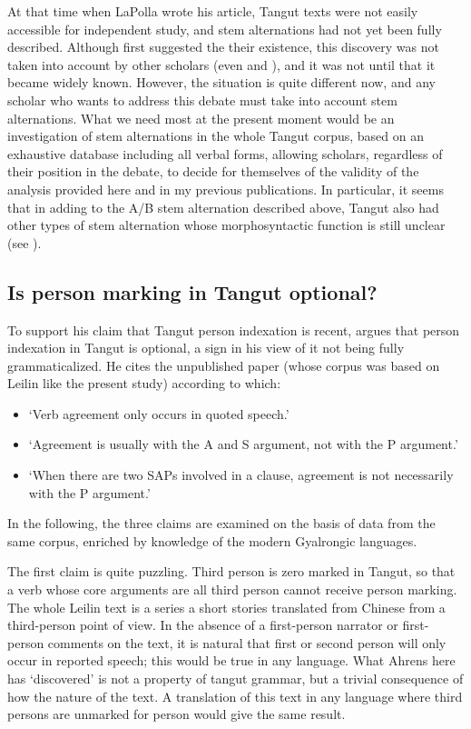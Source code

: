 \documentclass[oldfontcommands,oneside,a4paper,11pt]{article}
\begin{document}
At that time when LaPolla wrote his article, Tangut texts were not easily accessible for independent study, and stem alternations had not yet been fully described. Although \citet{nishida75} first suggested the their existence, this discovery was not taken into account by other scholars (even \citealt{kepping85} and \citealt{driem91tangut}), and it was not until \citet{gong01huying} that it became widely known. However, the situation is quite different now, and any scholar who wants to address this debate must take into account stem alternations. What we need most at the present moment would be an investigation of stem alternations in the whole Tangut corpus, based on an exhaustive database including all verbal forms, allowing scholars, regardless of their position in the debate, to decide for themselves of the validity of the analysis provided here and in my previous publications. In particular, it seems that in adding to the A/B stem alternation described above, Tangut also had other types of stem alternation whose morphosyntactic function is still unclear (see \citealt{jacques14esquisse}).

\subsection{Is person marking in Tangut optional?} \label{sec:optional}
To support his claim that Tangut person indexation is recent, 
\citet{lapolla92} argues that person indexation in Tangut is optional, a sign in his view of it not being fully grammaticalized. He cites the unpublished paper \citet{ahrens90tangut} (whose corpus was based on Leilin like the present study) according to which:

\begin{itemize}
\item `Verb agreement only occurs in quoted speech.'
\item `Agreement is usually with the A and S argument, not with the P argument.'
\item `When there are two SAPs involved in a clause, agreement is not necessarily with the P argument.'
\end{itemize}

In the following, the three claims are examined on the basis of data from the same corpus, enriched by knowledge of the modern Gyalrongic languages.

The first claim is quite puzzling. Third person is zero marked in Tangut, so that a verb whose core arguments are all third person cannot receive person marking. The whole Leilin text is a series a short stories translated from Chinese from a third-person point of view. In the absence of a first-person narrator or first-person comments on the text, it is natural that first or second person will only occur in reported speech; this would be true in any language. What Ahrens here has `discovered' is not a property of tangut grammar, but a trivial consequence of how the nature of the text. A translation of this text in any language where third persons are unmarked for person would give the same result.
\end{document}
